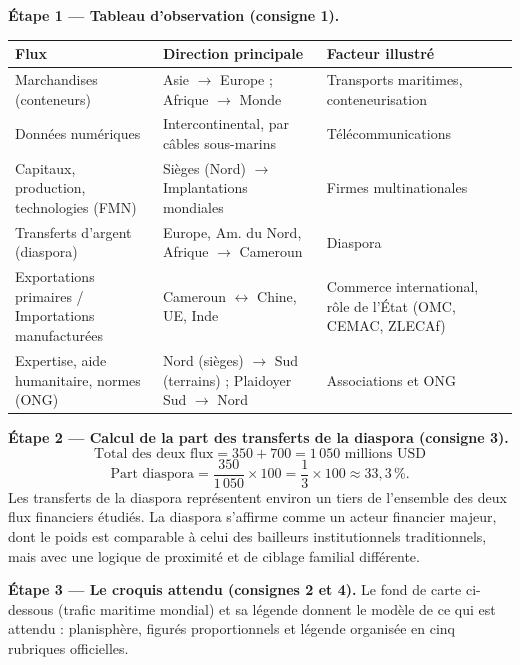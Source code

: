 \documentclass[11pt]{article}
\begin{document}
\begin{exoresolu}
\textbf{Étape 1 — Tableau d'observation (consigne 1).}

\begin{center}
\begin{tabularx}{\linewidth}{|l|X|X|}\hline
\rowcolor{popblueL} \textbf{Flux} & \textbf{Direction principale} & \textbf{Facteur illustré} \\ \hline
Marchandises (conteneurs) & Asie $\to$ Europe ; Afrique $\to$ Monde & Transports maritimes, conteneurisation \\ \hline
Données numériques & Intercontinental, par câbles sous-marins & Télécommunications \\ \hline
Capitaux, production, technologies (FMN) & Sièges (Nord) $\to$ Implantations mondiales & Firmes multinationales \\ \hline
Transferts d'argent (diaspora) & Europe, Am. du Nord, Afrique $\to$ Cameroun & Diaspora \\ \hline
Exportations primaires / Importations manufacturées & Cameroun $\leftrightarrow$ Chine, UE, Inde & Commerce international, rôle de l'État (OMC, CEMAC, ZLECAf) \\ \hline
Expertise, aide humanitaire, normes (ONG) & Nord (sièges) $\to$ Sud (terrains) ; Plaidoyer Sud $\to$ Nord & Associations et ONG \\ \hline
\end{tabularx}
\end{center}

\tcblower

\textbf{Étape 2 — Calcul de la part des transferts de la diaspora (consigne 3).}
\[
\text{Total des deux flux} = 350 + 700 = 1\,050 \text{ millions USD}
\]
\[
\text{Part diaspora} = \frac{350}{1\,050} \times 100 = \frac{1}{3} \times 100 \approx 33,3\,\%.
\]
Les transferts de la diaspora représentent environ un tiers de l'ensemble des deux flux financiers étudiés. La diaspora s'affirme comme un acteur financier majeur, dont le poids est comparable à celui des bailleurs institutionnels traditionnels, mais avec une logique de proximité et de ciblage familial différente.

\textbf{Étape 3 — Le croquis attendu (consignes 2 et 4).} Le fond de carte ci-dessous (trafic maritime mondial) et sa légende donnent le modèle de ce qui est attendu : planisphère, figurés proportionnels et légende organisée en cinq rubriques officielles.


\end{exoresolu}
\end{document}
